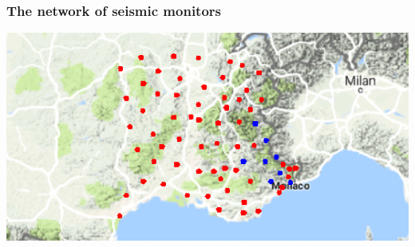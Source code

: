 \documentclass{beamer}
\begin{document}
\begin{frame}
\frametitle{The network of seismic monitors}
\includegraphics[width=\textwidth]{../figures/TestStations_zoom.png}
\end{frame}
\end{document}
